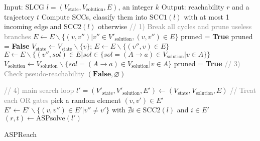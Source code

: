 \begin{algorithm}[htb]
\begin{algorithmic}[1]
\State Input: SLCG $l=(V_{\mathrm{state}},V_{\mathrm{solution}}, E)$, an integer $k$
\State Output: reachability $r$ and a trajectory $t$
\State Compute SCCs, classify them into $\mathrm{SCC1}(l)$ with at most 1 incoming edge and $\mathrm{SCC2}(l)$ otherwise
\State \textcolor{gray}{// 1) Break all cycles and prune useless branches}\label{delete_cycle_begin}
        \State $E\gets E\backslash \{(v,v'')|v''\in V'_{\mathrm{solution}},(v,v'')\in E\}$
    \EndIf
\EndFor
\EndFor \label{delete_cycle_end}
\State{\textcolor{gray}{// 2) remove useless nodes/edges}} \label{prune_begin}
\State pruned = \textbf{True}
    \State pruned = \textbf{False}
            \State $V_{\mathrm{state}} \gets V_{\mathrm{state}}\backslash \{v\}$; $E\gets E\backslash \{ (v'',v)\in E\}$
            \State $E\gets E\backslash \{ (v'',sol)\in E | sol \in \{sol = (A \rightarrow a) \in V_{\mathrm{solution}} | v \in A\}\}$
            \State $V_{\mathrm{solution}} \gets V_{\mathrm{solution}}\backslash \{sol = (A \rightarrow a) \in V_{\mathrm{solution}} | v \in A\}$
            \State pruned = \textbf{True}
        \EndIf
    \EndFor \label{prune_end}
\EndWhile
\State \textcolor{gray}{// 3) Check pseudo-reachability} \label{pseudo_reach_begin}
    \State \Return $(\mathbf{False},\varnothing)$
\EndIf \label{pseudo_reach_end}

\State \textcolor{gray}{// 4) main search loop} \label{main_loop_begin}
    \State $l'=(V'_{\mathrm{state}}, V'_{\mathrm{solution}},E')\gets(V_{\mathrm{state}}, V_{\mathrm{solution}},E)$ 
     \textcolor{gray}{// Treat each OR gates}
        \State pick a random element $(v,v') \in E'$
        \State $E'\gets E' \backslash  \{(v,v'') \in E'| v''\neq v'\}$ with $\nexists i\in \mathrm{SCC2}(l)$ and $i\in E'$
    \EndFor
    \State $(r,t)\gets\mathrm{ASPsolve}(l')$
    \EndIf
\EndFor \label{main_loop_end}
\State {}
\end{algorithmic}
\caption{ASPReach}\label{algOverall}
\end{algorithm}

